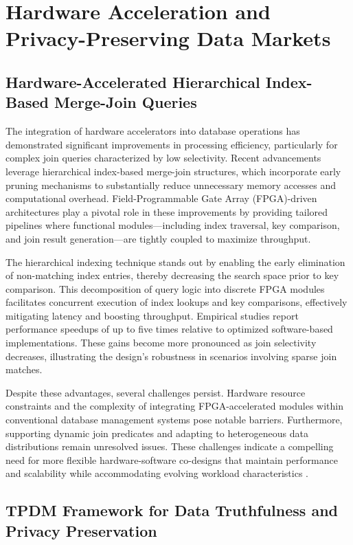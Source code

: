 \documentclass[sigconf]{acmart}
\begin{document}
\section{Hardware Acceleration and Privacy-Preserving Data Markets}

\subsection{Hardware-Accelerated Hierarchical Index-Based Merge-Join Queries}

The integration of hardware accelerators into database operations has demonstrated significant improvements in processing efficiency, particularly for complex join queries characterized by low selectivity. Recent advancements leverage hierarchical index-based merge-join structures, which incorporate early pruning mechanisms to substantially reduce unnecessary memory accesses and computational overhead. Field-Programmable Gate Array (FPGA)-driven architectures play a pivotal role in these improvements by providing tailored pipelines where functional modules---including index traversal, key comparison, and join result generation---are tightly coupled to maximize throughput.

The hierarchical indexing technique stands out by enabling the early elimination of non-matching index entries, thereby decreasing the search space prior to key comparison. This decomposition of query logic into discrete FPGA modules facilitates concurrent execution of index lookups and key comparisons, effectively mitigating latency and boosting throughput. Empirical studies report performance speedups of up to five times relative to optimized software-based implementations. These gains become more pronounced as join selectivity decreases, illustrating the design’s robustness in scenarios involving sparse join matches.

Despite these advantages, several challenges persist. Hardware resource constraints and the complexity of integrating FPGA-accelerated modules within conventional database management systems pose notable barriers. Furthermore, supporting dynamic join predicates and adapting to heterogeneous data distributions remain unresolved issues. These challenges indicate a compelling need for more flexible hardware-software co-designs that maintain performance and scalability while accommodating evolving workload characteristics \cite{ref24}.

\subsection{TPDM Framework for Data Truthfulness and Privacy Preservation}
\end{document}
